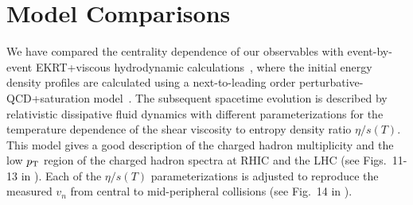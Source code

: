 \section{Model Comparisons}
\label{sec:theory}
We have compared the centrality dependence of our observables with event-by-event EKRT+viscous hydrodynamic calculations~\cite{Niemi:2015qia}, where the initial energy density profiles are calculated using a next-to-leading order perturbative-QCD+saturation model~\cite{Paatelainen:2012at,Paatelainen:2013eea}. The subsequent spacetime evolution is described by relativistic dissipative fluid dynamics with different parameterizations for the temperature dependence of the shear viscosity to entropy density ratio $\eta/s(T)$. 
This model gives a good description of the charged hadron multiplicity and the low $p_{\rm T}$ region of the charged hadron spectra at RHIC and the LHC (see Figs.~11-13 in \cite{Niemi:2015qia}).
Each of the $\eta/s(T)$ parameterizations is adjusted to reproduce the measured $v_n$ from central to mid-peripheral collisions (see Fig.~14 in \cite{Niemi:2015qia}). 

